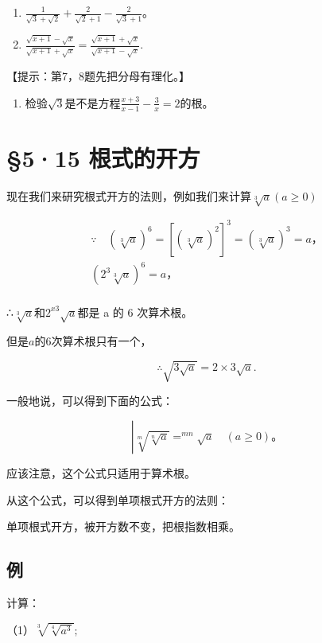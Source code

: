 \begin{enumerate}[start=7]
\item
  \(\frac{1}{\sqrt{3} + \sqrt{2}} + \frac{2}{\sqrt{2} + 1} - \frac{2}{\sqrt{3} + 1}\)。
\item
  \(\frac{\sqrt{x + 1} - \sqrt{x}}{\sqrt{x + 1} + \sqrt{x}} = \frac{\sqrt{x + 1} + \sqrt{x}}{\sqrt{x + 1} - \sqrt{x}}.\)
\end{enumerate}

【提示：第7，8题先把分母有理化。】

\begin{enumerate}[start=9]
\item
  检验\(\sqrt{3}\)是不是方程\(\frac{x + 3}{x - 1} - \frac{3}{x} = 2\)的根。
\end{enumerate}

\section{§5·15 根式的开方}

现在我们来研究根式开方的法则，例如我们来计算\(\sqrt[3]{a} (a\geqslant 0)\)

\[
\begin{array}{l} \because \quad (\sqrt[3]{a}) ^ {6} = [ (\sqrt[3]{a}) ^ {2} ] ^ {3} = (\sqrt[3]{a}) ^ {3} = a\text{，} \\ (2 ^ {3} \sqrt[3]{a}) ^ {6} = a\text{，} \\ \end{array}
\]

∴\(\sqrt[3]{a}\)和\(2^{x3}\sqrt{a}\)都是 a 的 6 次算术根。

但是\(a\)的6次算术根只有一个，

\[
\therefore \sqrt {3 \sqrt {a}} = 2 \times 3 \sqrt {a}.
\]

一般地说，可以得到下面的公式：

\[
\left| \sqrt[m]{\sqrt[n]{a}} = ^ {m n} \sqrt {a} \quad (a \geqslant 0)\text{。} \right.
\]

应该注意，这个公式只适用于算术根。

从这个公式，可以得到单项根式开方的法则：

单项根式开方，被开方数不变，把根指数相乘。

\subsection{例}

计算：

（1）\(\sqrt[3]{\sqrt[4]{a^3}};\)

